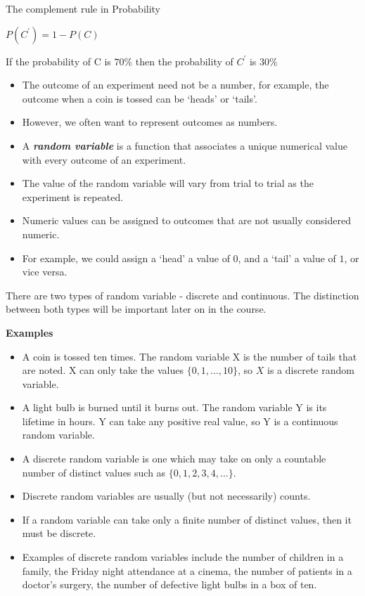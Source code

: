 \documentclass[12pt]{report}
\begin{document}
{{The complement rule in Probability

$P(C^{\prime}) = 1- P(C)$


If the probability of C is $70 \%$ then the probability of $C^{\prime}$ is $30\%$

{\LARGE
	\begin{itemize} \item The outcome of an experiment need not be a number, for example, the outcome when a coin is tossed can be `heads' or `tails'. \item
		However, we often want to represent outcomes as numbers. \item
		A \textbf{\emph{random variable}} is a function that associates a unique numerical value with every outcome of an experiment.
		\item The value of the random variable will vary from trial to trial as the experiment is repeated.
		\item Numeric values can be assigned to outcomes that are not usually considered numeric. \item For example, we could assign a `head' a value of $0$, and a `tail' a value of $1$, or vice versa.
	\end{itemize}
}
{\LARGE
	There are two types of random variable - discrete and continuous. The distinction between both types will be important later on in the course.\\ \bigskip
	
	\textbf{Examples}
	\begin{itemize}
		\item A coin is tossed ten times. The random variable X is the number of tails that are noted.
		X can only take the values $\{0, 1, ..., 10\}$, so $X$ is a discrete random variable.
		\item A light bulb is burned until it burns out. The random variable Y is its lifetime in hours.
		Y can take any positive real value, so Y is a continuous random variable.
	\end{itemize}
}

{\LARGE
	\begin{itemize}
		\item A discrete random variable is one which may take on only a countable number of distinct values such as $\{0, 1, 2, 3, 4, ... \}$.\item Discrete random variables are usually (but not necessarily) counts. \item If a random variable can take only a finite number of distinct values, then it must be discrete. \item Examples of discrete random variables include the number of children in a family, the Friday night attendance at a cinema, the number of patients in a doctor's surgery, the number of defective light bulbs in a box of ten.
	\end{itemize}
}


}}
\end{document}
